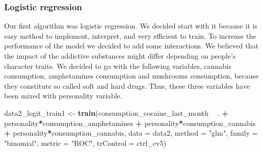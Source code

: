 \documentclass[
]{article}
\newenvironment{Shaded}{\begin{snugshade}}{\end{snugshade}}
\newcommand{\CommentTok}[1]{\textcolor[rgb]{0.56,0.35,0.01}{\textit{#1}}}
\newcommand{\DataTypeTok}[1]{\textcolor[rgb]{0.13,0.29,0.53}{#1}}
\newcommand{\DecValTok}[1]{\textcolor[rgb]{0.00,0.00,0.81}{#1}}
\newcommand{\KeywordTok}[1]{\textcolor[rgb]{0.13,0.29,0.53}{\textbf{#1}}}
\newcommand{\NormalTok}[1]{#1}
\newcommand{\OperatorTok}[1]{\textcolor[rgb]{0.81,0.36,0.00}{\textbf{#1}}}
\newcommand{\OtherTok}[1]{\textcolor[rgb]{0.56,0.35,0.01}{#1}}
\newcommand{\StringTok}[1]{\textcolor[rgb]{0.31,0.60,0.02}{#1}}
\begin{document}
\begin{Shaded}
\end{Shaded}

\hypertarget{logistic-regression}{%
\subsubsection{Logistic regression}\label{logistic-regression}}

Our first algorithm was logistic regression. We decided start with it
because it is easy method to implement, interpret, and very efficient to
train. To increase the performance of the model we decided to add some
interactions. We believed that the impact of the addictive substances
might differ depending on people's character traits. We decided to go
with the following variables, cannabis consumption, amphetamines
consumption and mushrooms consumption, because they constitute so called
soft and hard drugs. Thus, these three variables have been mixed with
personality variable.

\begin{Shaded}
\begin{Highlighting}[]
\NormalTok{data2_logit_train1 <-}\StringTok{ }
\StringTok{  }\KeywordTok{train}\NormalTok{(consumption_cocaine_last_month }\OperatorTok{~}\StringTok{ }\NormalTok{. }\OperatorTok{+}\StringTok{ }\NormalTok{personality}\OperatorTok{*}\NormalTok{consumption_amphetamines }
        \OperatorTok{+}\StringTok{ }\NormalTok{personality}\OperatorTok{*}\NormalTok{consumption_cannabis }\OperatorTok{+}\StringTok{ }\NormalTok{personality}\OperatorTok{*}\NormalTok{consumption_cannabis,}
        \DataTypeTok{data =}\NormalTok{ data2,        }
        \DataTypeTok{method =} \StringTok{"glm"}\NormalTok{,}
        \DataTypeTok{family =} \StringTok{"binomial"}\NormalTok{,}
        \DataTypeTok{metric =} \StringTok{"ROC"}\NormalTok{,}
        \DataTypeTok{trControl =}\NormalTok{ ctrl_cv5)}
\end{Highlighting}
\end{Shaded}
\end{document}
